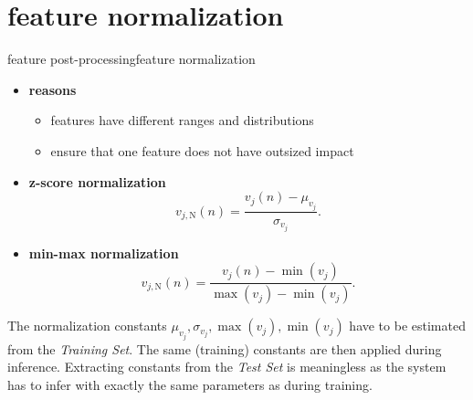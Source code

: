     \section[normalization]{feature normalization}
		\begin{frame}{feature post-processing}{feature normalization}
            \begin{itemize}
                \item \textbf{reasons}
                    \begin{itemize}
                        \item   features have different ranges and distributions
                        \item   ensure that one feature does not have outsized impact
                    \end{itemize}
                \smallskip
                \item   \textbf{z-score normalization}
                    \begin{equation*}\label{eq:featnorm_zscore}
                        v_{j,\mathrm{N}}(n) = \frac{v_j(n) - \mu_{v_j}}{\sigma_{v_j}}.
                    \end{equation*}
                \smallskip
                \item   \textbf{min-max normalization}
                    \begin{equation*}\label{eq:featnorm_minmax}
                        v_{j,\mathrm{N}}(n) = \frac{v_j(n) - \min(v_j)}{\max(v_j) - \min(v_j)}.
                    \end{equation*}
            \end{itemize}
            \begin{block}
                The normalization constants $\mu_{v_j},\sigma_{v_j},\max(v_j),\min(v_j)$ have to be estimated from the \emph{{Training Set}}. The same (training) constants are then applied during inference. Extracting constants from the \emph{Test Set} is meaningless as the system has to infer with exactly the same parameters as during training. 
            \end{block}
		\end{frame}

